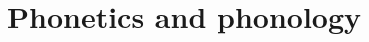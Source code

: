\documentclass[output=book
		,modfonts,nonflat
	        ,collection
	        ,collectionchapter
		,colorlinks,citecolor=brown 	
		,showindex
		  ]{langsci/langscibook}
\begin{document}
         
\newcommand{\lsCollectionPaperFirstPage}{1}
\newcommand{\lsCollectionPaperLastPage}{1}
\maketitle                
\frontmatter

\tableofcontents
% 
% 

\mainmatter          

\renewcommand{\lsChapterFooterSize}{\footnotesize}
\part{Phonetics and phonology}
\end{document}
